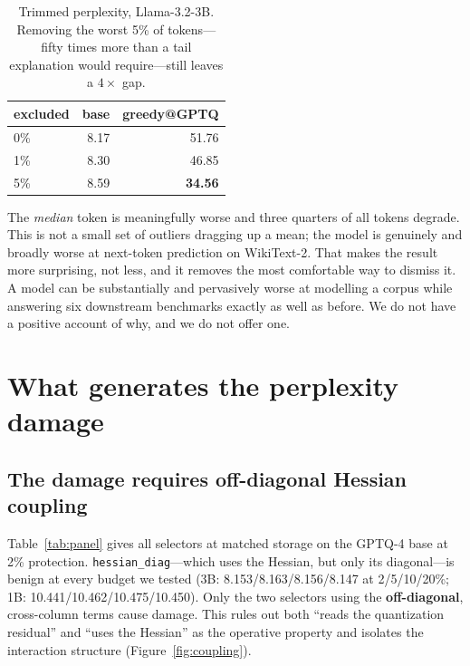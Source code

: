 \documentclass[11pt]{article}
\newcommand{\best}[1]{\textbf{#1}}
\begin{document}
\begin{table}[t]
\centering\small
\begin{tabular}{lrr}
\toprule
excluded & base & greedy@GPTQ \\
\midrule
0\% & 8.17 & 51.76 \\
1\% & 8.30 & 46.85 \\
5\% & 8.59 & \best{34.56} \\
\bottomrule
\end{tabular}
\caption{Trimmed perplexity, Llama-3.2-3B. Removing the worst 5\% of tokens---fifty times more
than a tail explanation would require---still leaves a $4\times$ gap.}
\label{tab:trimmed}
\end{table}

The \emph{median} token is meaningfully worse and three quarters of all tokens degrade. This is
not a small set of outliers dragging up a mean; the model is genuinely and broadly worse at
next-token prediction on WikiText-2. That makes the result more surprising, not less, and it
removes the most comfortable way to dismiss it. A model can be substantially and pervasively
worse at modelling a corpus while answering six downstream benchmarks exactly as well as
before. We do not have a positive account of why, and we do not offer one.

\section{What generates the perplexity damage}
\label{sec:generates}

\subsection{The damage requires off-diagonal Hessian coupling}
\label{sec:offdiag}

Table~\ref{tab:panel} gives all selectors at matched storage on the GPTQ-4 base at 2\%
protection. \texttt{hessian\_diag}---which uses the Hessian, but only its diagonal---is benign at
every budget we tested (3B: 8.153/8.163/8.156/8.147 at 2/5/10/20\%; 1B:
10.441/10.462/10.475/10.450). Only the two selectors using the \textbf{off-diagonal},
cross-column terms cause damage. This rules out both ``reads the quantization residual'' and
``uses the Hessian'' as the operative property and isolates the interaction structure
(Figure~\ref{fig:coupling}).
\end{document}
